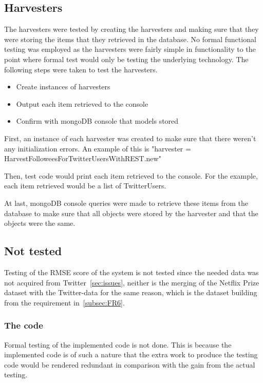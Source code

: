 \subsection{Harvesters}
The harvesters were tested by creating the harvesters and making sure that they were storing the items that they retrieved in the database. No formal functional testing was employed as the harvesters were fairly simple in functionality to the point where formal test would only be testing the underlying technology. The following steps were taken to test the harvesters.

	\begin{itemize}
	\item Create instances of harvesters
	\item Output each item retrieved to the console
	\item Confirm with mongoDB console that models stored
	\end{itemize}

First, an instance of each harvester was created to make sure that there weren't any initialization errors. An example of this is "harvester = HarvestFolloweesForTwitterUsersWithREST.new"

Then, test code would print each item retrieved to the console. For the example, each item retrieved would be a list of TwitterUsers.

At last, mongoDB console queries were made to retrieve these items from the database to make sure that all objects were stored by the harvester and that the objects were the same.

\subsection{Not tested}
Testing of the RMSE score of the system is not tested since the needed data was not acquired from Twitter~\ref{sec:issues}, neither is the merging of the Netflix Prize dataset with the Twitter-data for the same reason, which is the dataset building from the requirement in~\ref{subsec:FR6}.

\subsubsection{The code}
Formal testing of the implemented code is not done. This is because the implemented code is of such a nature that the extra work to produce the testing code would be rendered redundant in comparison with the gain from the actual testing.
